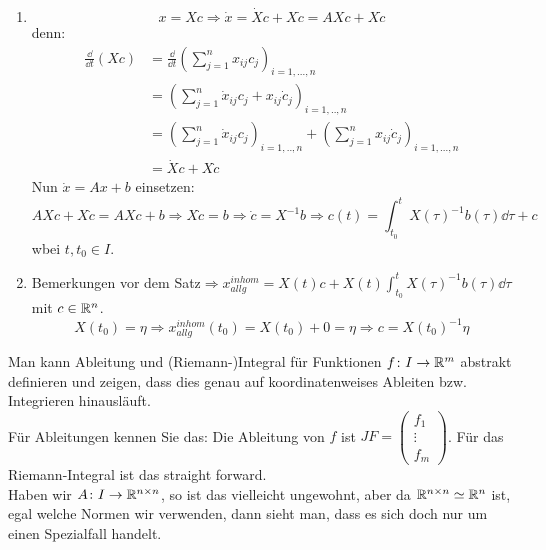 \begin{beweis}
	\begin{enumerate}
		\item \[ x=Xc\Rightarrow \dot x=\dot Xc+X\dot c=AXc+X\dot c \]
		denn: 
		\begin{align*} \frac{\dd}{\dd t}(Xc)&=\frac{\dd}{\dd t}\left(\sum_{j=1}^{n}x_{ij}c_j\right)_{i=1,...,n}\\&=\left(\sum_{j=1}^{n}\dot x_{ij}c_j+x_{ij}\dot c_j\right)_{i=1,..,n}\\&=\left(\sum_{j=1}^{n}\dot x_{ij}c_j \right)_{i=1,..,n}+\left(\sum_{j=1}^{n}x_{ij}\dot c_j\right)_{i=1,...,n}\\&=\dot Xc+X\dot c \end{align*}
		Nun $ \dot x=Ax+b $ einsetzen:
		\[ AXc+X\dot c=AXc+b\Rightarrow X\dot c=b\Rightarrow\dot c=X^{-1}b\Rightarrow c(t)=\int_{t_0}^t X(\tau)^{-1}b(\tau)\dd\tau+c \]
		wbei $ t,t_0\in I $.
		\item Bemerkungen vor dem Satz$ \Rightarrow x_{allg}^{inhom}=X(t)c+X(t)\int_{t_0}^tX(\tau)^{-1}b(\tau)\dd \tau $ mit $ c\in\mathbb{R}^n $.
		\[ X(t_0)=\eta\Rightarrow x_{allg}^{inhom}(t_0)=X(t_0)+0=\eta\Rightarrow c=X(t_0)^{-1}\eta \]
	\end{enumerate}
\end{beweis}
\begin{bemerkung}
	Man kann Ableitung und (Riemann-)Integral f\"ur Funktionen $ f\colon I\rightarrow\mathbb{R}^m $ abstrakt definieren und zeigen, dass dies genau auf koordinatenweises Ableiten bzw. Integrieren hinausl\"auft.\\
	F\"ur Ableitungen kennen Sie das: Die Ableitung von $ f $ ist $ JF=\begin{pmatrix}
	f_1\\\vdots\\f_m
	\end{pmatrix} $. F\"ur das Riemann-Integral ist das straight forward.\\
	Haben wir $ A\colon I\rightarrow\mathbb{R}^{n\times n} $, so ist das vielleicht ungewohnt, aber da $ \mathbb{R}^{n\times n}\simeq\mathbb{R}^n $ ist, egal welche Normen wir verwenden, dann sieht man, dass es sich doch nur um einen Spezialfall handelt.
\end{bemerkung}